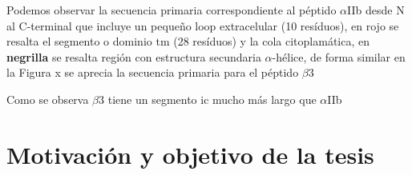 Podemos observar la secuencia primaria correspondiente al péptido $\alpha$IIb desde N al C-terminal que incluye un pequeño loop extracelular (10 resíduos), en rojo se resalta el segmento o dominio \ac{tm} (28 resíduos) y la cola citoplamática, en \textbf{negrilla} se resalta región con estructura secundaria $\alpha$-hélice,  de forma similar en la Figura x se aprecia la secuencia primaria para el péptido $\beta$3


Como se observa $\beta$3 tiene un segmento \ac{ic} mucho más largo que $\alpha$IIb


\section{Motivación y objetivo de la tesis}